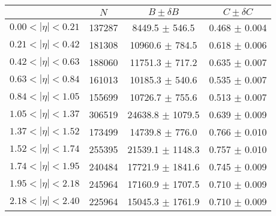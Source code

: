 \begin{tabular}{lccc}
\hline
    &   $N$   & $B \pm \delta B$  &  $C \pm \delta C$ \\
\hline
$0.00 < |\eta| <0.21$          & 137287     & 8449.5     $\pm$ 546.5 & 0.468      $\pm$ 0.004 \\
$0.21 < |\eta| <0.42$          & 181308     & 10960.6    $\pm$ 784.5 & 0.618      $\pm$ 0.006 \\
$0.42 < |\eta| <0.63$          & 188060     & 11751.3    $\pm$ 717.2 & 0.635      $\pm$ 0.007 \\
$0.63 < |\eta| <0.84$          & 161013     & 10185.3    $\pm$ 540.6 & 0.535      $\pm$ 0.007 \\
$0.84 < |\eta| <1.05$          & 155699     & 10726.7    $\pm$ 755.6 & 0.513      $\pm$ 0.007 \\
$1.05 < |\eta| <1.37$          & 306519     & 24638.8    $\pm$ 1079.5 & 0.639      $\pm$ 0.009 \\
$1.37 < |\eta| <1.52$          & 173499     & 14739.8    $\pm$ 776.0 & 0.766      $\pm$ 0.010 \\
$1.52 < |\eta| <1.74$          & 255395     & 21539.1    $\pm$ 1148.3 & 0.757      $\pm$ 0.010 \\
$1.74 < |\eta| <1.95$          & 240484     & 17721.9    $\pm$ 1841.6 & 0.745      $\pm$ 0.009 \\
$1.95 < |\eta| <2.18$          & 245964     & 17160.9    $\pm$ 1707.5 & 0.710      $\pm$ 0.009 \\
$2.18 < |\eta| <2.40$          & 225964     & 15045.3    $\pm$ 1761.9 & 0.710      $\pm$ 0.009 \\
\hline
\end{tabular}
